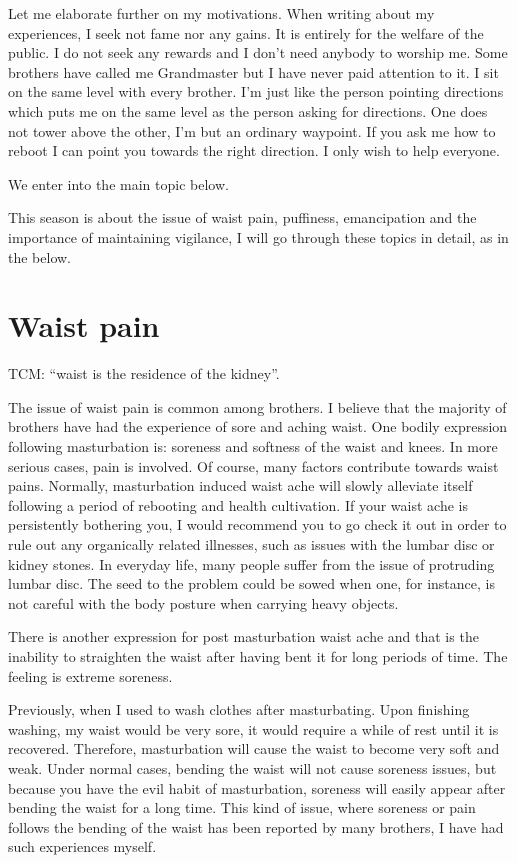 \documentclass[
]{book}
\begin{document}
Let me elaborate further on my motivations. When writing about my experiences, I seek not fame nor any gains. It is entirely for the welfare of the public. I do not seek any rewards and I don't need anybody to worship me. Some brothers have called me Grandmaster but I have never paid attention to it. I sit on the same level with every brother. I'm just like the person pointing directions which puts me on the same level as the person asking for directions. One does not tower above the other, I'm but an ordinary waypoint. If you ask me how to reboot I can point you towards the right direction. I only wish to help everyone.

We enter into the main topic below.

This season is about the issue of waist pain, puffiness, emancipation and the importance of maintaining vigilance, I will go through these topics in detail, as in the below.

\hypertarget{waist-pain}{%
\section{Waist pain}\label{waist-pain}}

TCM: ``waist is the residence of the kidney''.

The issue of waist pain is common among brothers. I believe that the majority of brothers have had the experience of sore and aching waist. One bodily expression following masturbation is: soreness and softness of the waist and knees. In more serious cases, pain is involved. Of course, many factors contribute towards waist pains. Normally, masturbation induced waist ache will slowly alleviate itself following a period of rebooting and health cultivation. If your waist ache is persistently bothering you, I would recommend you to go check it out in order to rule out any organically related illnesses, such as issues with the lumbar disc or kidney stones. In everyday life, many people suffer from the issue of protruding lumbar disc. The seed to the problem could be sowed when one, for instance, is not careful with the body posture when carrying heavy objects.

There is another expression for post masturbation waist ache and that is the inability to straighten the waist after having bent it for long periods of time. The feeling is extreme soreness.

Previously, when I used to wash clothes after masturbating. Upon finishing washing, my waist would be very sore, it would require a while of rest until it is recovered. Therefore, masturbation will cause the waist to become very soft and weak. Under normal cases, bending the waist will not cause soreness issues, but because you have the evil habit of masturbation, soreness will easily appear after bending the waist for a long time. This kind of issue, where soreness or pain follows the bending of the waist has been reported by many brothers, I have had such experiences myself.
\end{document}
